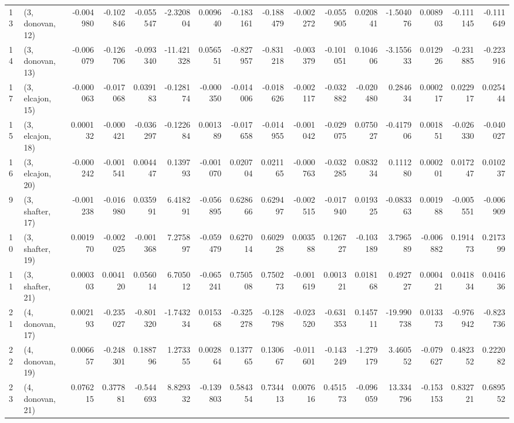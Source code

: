 \begin{tabular}{llrrrrrrrrrrrrrr}
13 &  (3, donovan, 12) &  -0.004980 & -0.102846 & -0.055547 &  -2.320804 &  0.009640 &  -0.183161 & -0.188479 & -0.002272 & -0.055905 &  0.020841 &  -1.504076 &  0.008903 & -0.111145 & -0.111649 \\
14 &  (3, donovan, 13) &  -0.006079 & -0.126706 & -0.093340 & -11.421328 &  0.056551 &  -0.827957 & -0.831218 & -0.003379 & -0.101051 &  0.104606 &  -3.155633 &  0.012926 & -0.231885 & -0.223916 \\
17 &  (3, elcajon, 15) &  -0.000063 & -0.017068 &  0.039183 &  -0.128174 & -0.000350 &  -0.014006 & -0.018626 & -0.002117 & -0.032882 & -0.020480 &   0.284634 &  0.000217 &  0.022917 &  0.025444 \\
15 &  (3, elcajon, 18) &   0.000132 & -0.000421 & -0.036297 &  -0.122684 &  0.001389 &  -0.017658 & -0.014955 & -0.001042 & -0.029075 &  0.075027 &  -0.417906 &  0.001851 & -0.026330 & -0.040027 \\
16 &  (3, elcajon, 20) &  -0.000242 & -0.001541 &  0.004447 &   0.139793 & -0.001070 &   0.020704 &  0.021165 & -0.000763 & -0.032285 &  0.083234 &   0.111280 &  0.000201 &  0.017247 &  0.010237 \\
9  &  (3, shafter, 17) &  -0.001238 & -0.016980 &  0.035991 &   6.418291 & -0.056895 &   0.628666 &  0.629497 & -0.002515 & -0.017940 &  0.019325 &  -0.083363 &  0.001988 & -0.005551 & -0.006909 \\
10 &  (3, shafter, 19) &   0.001970 & -0.002025 & -0.001368 &   7.275897 & -0.059479 &   0.627014 &  0.602928 &  0.003588 &  0.126727 & -0.103189 &   3.796589 & -0.006882 &  0.191473 &  0.217399 \\
11 &  (3, shafter, 21) &   0.000303 &  0.004120 &  0.056014 &   6.705012 & -0.065241 &   0.750508 &  0.750273 & -0.001619 &  0.001321 &  0.018168 &   0.492727 &  0.000421 &  0.041834 &  0.041636 \\
21 &  (4, donovan, 17) &   0.002193 & -0.235027 & -0.801320 &  -1.743234 &  0.015368 &  -0.325278 & -0.128798 & -0.023520 & -0.631353 &  0.145711 & -19.990738 &  0.013373 & -0.976942 & -0.823736 \\
22 &  (4, donovan, 19) &   0.006657 & -0.248301 &  0.188796 &   1.273355 &  0.002864 &   0.137765 &  0.130667 & -0.011601 & -0.143249 & -1.279179 &   3.460552 & -0.079627 &  0.482352 &  0.222082 \\
23 &  (4, donovan, 21) &   0.076215 &  0.377881 & -0.544693 &   8.829332 & -0.139803 &   0.584354 &  0.734413 &  0.007616 &  0.451573 & -0.096059 &  13.334796 & -0.153153 &  0.832721 &  0.689552 \\

\end{tabular}
